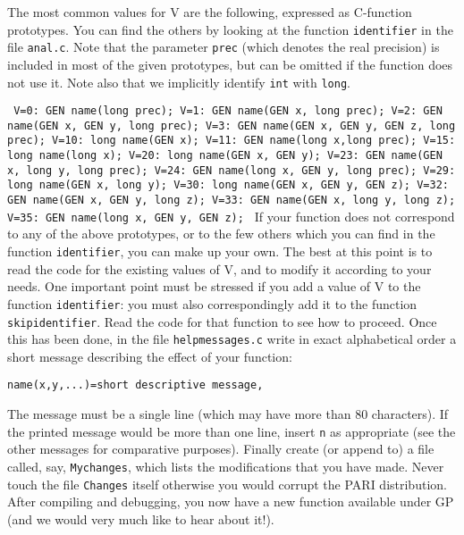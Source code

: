The most common values for V are the following, expressed as C-function
prototypes. You can find the others by looking at the function {\tt identifier}
in the file {\tt anal.c}. Note that the parameter {\tt prec} (which denotes the
real precision) is included in most of the given prototypes, but can be omitted
if the function does not use it. Note also that we implicitly identify 
{\tt int} with {\tt long}.

{\tt 
\obeylines
V=0: GEN name(long prec);
V=1: GEN name(GEN x, long prec);
V=2: GEN name(GEN x, GEN y, long prec);
V=3: GEN name(GEN x, GEN y, GEN z, long prec);
V=10: long name(GEN x);
V=11: GEN name(long x,long prec);
V=15: long name(long x);
V=20: long name(GEN x, GEN y);
V=23: GEN name(GEN x, long y, long prec);
V=24: GEN name(long x, GEN y, long prec);
V=29: long name(GEN x, long y);
V=30: long name(GEN x, GEN y, GEN z);
V=32: GEN name(GEN x, GEN y, long z);
V=33: GEN name(GEN x, long y, long z);
V=35: GEN name(long x, GEN y, GEN z);
}
\smallskip
If your function does not correspond to any of the above prototypes, or to the
few others which you can find in the function {\tt identifier}, you can make up
your own. The best at this point is to read the code for the existing values of
V, and to modify it according to your needs. One important point must be 
stressed if you add a value of V to the function {\tt identifier}: you must
also correspondingly add it to the function {\tt skipidentifier}. Read the code
for that function to see how to proceed.
\smallskip
Once this has been done, in the file {\tt helpmessages.c} write in exact
alphabetical order a short message describing the effect of your function:

{\tt \quo name(x,y,...)=short descriptive message\quo,}

The message must be a single line (which may have more than 80 characters). 
If the printed message would be more than one line, insert {\tt \bs n}
as appropriate (see the other messages for comparative purposes).
\smallskip
Finally create (or append to) a file called, say, {\tt Mychanges}, which lists
the modifications that you have made. Never touch the file {\tt Changes} itself
otherwise you would corrupt the PARI distribution.
After compiling and debugging, you now have a new function available under GP
(and we would very much like to hear about it!).





\vfill\eject
